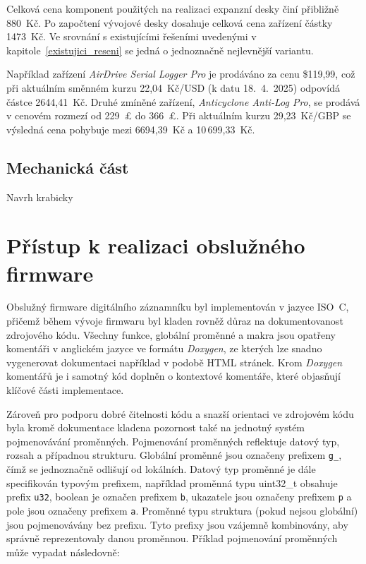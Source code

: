Celková cena komponent použitých na realizaci expanzní desky činí přibližně 880~Kč. Po započtení vývojové desky dosahuje celková cena zařízení částky 1473~Kč. Ve srovnání s existujícími řešeními uvedenými v kapitole~\ref{existujici_reseni} se jedná o jednoznačně nejlevnější variantu.

Například zařízení \textit{AirDrive Serial Logger Pro} je prodáváno za cenu \$119{,}99, což při aktuálním směnném kurzu 22{,}04~Kč/USD (k datu 18.~4.~2025) odpovídá částce 2644{,}41~Kč. Druhé zmíněné zařízení, \textit{Anticyclone Anti-Log Pro}, se prodává v cenovém rozmezí od 229~£ do 366~£. Při aktuálním kurzu 29{,}23~Kč/GBP se výsledná cena pohybuje mezi 6694{,}39~Kč a 10\,699{,}33~Kč.

\newpage

\section{Mechanická část}
Navrh krabicky

\chapter{Přístup k realizaci obslužného firmware}
\label{softwarova_implementace}
Obslužný firmware digitálního záznamníku byl implementován v jazyce ISO~C, přičemž během vývoje firmwaru byl kladen rovněž důraz na dokumentovanost zdrojového kódu. Všechny funkce, globální proměnné a makra jsou opatřeny komentáři v anglickém jazyce ve formátu \textit{Doxygen}, ze kterých lze snadno vygenerovat dokumentaci například v podobě HTML stránek. Krom \textit{Doxygen} komentářů je i samotný kód doplněn o kontextové komentáře, které objasňují klíčové části implementace.

Zároveň pro podporu dobré čitelnosti kódu a snazší orientaci ve zdrojovém kódu byla kromě dokumentace kladena pozornost také na jednotný systém pojmenovávání proměnných. Pojmenování proměnných reflektuje datový typ, rozsah a případnou strukturu. Globální proměnné jsou označeny prefixem \texttt{g\_}, čímž se jednoznačně odlišují od lokálních. Datový typ proměnné je dále specifikován typovým prefixem, například proměnná typu uint32\_t obsahuje prefix \texttt{u32}, boolean je označen prefixem \texttt{b}, ukazatele jsou označeny prefixem \texttt{p} a pole jsou označeny prefixem \texttt{a}. Proměnné typu struktura (pokud nejsou globální) jsou pojmenovávány bez prefixu. Tyto prefixy jsou vzájemně kombinovány, aby správně reprezentovaly danou proměnnou. Příklad pojmenování proměnných může vypadat následovně:

